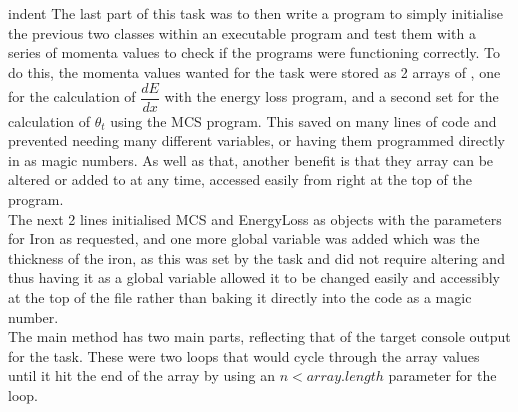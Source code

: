 \documentclass[twocolumn]{article}
\begin{document}
\\\\indent The last part of this task was to then write a program to simply initialise the previous two classes within an executable program and test them with a series of momenta values to check if the programs were functioning correctly. To do this, the momenta values wanted for the task were stored as 2 arrays of , one for the calculation of $\dfrac{dE}{dx}$ with the energy loss program, and a second set for the calculation of $\theta_t$ using the MCS program. This saved on many lines of code and prevented needing many different variables, or having them programmed directly in as magic numbers. As well as that, another benefit is that they array can be altered or added to at any time, accessed easily from right at the top of the program. \\\indent The next 2 lines initialised MCS and EnergyLoss as objects with the parameters for Iron as requested, and one more global variable was added which was the thickness of the iron, as this was set by the task and did not require altering and thus having it as a global variable allowed it to be changed easily and accessibly at the top of the file rather than baking it directly into the code as a magic number. \\\indent The main method has two main parts, reflecting that of the target console output for the task. These were two loops that would cycle through the array values until it hit the end of the array by using an $n<array.length$ parameter for the  loop.
\end{document}
